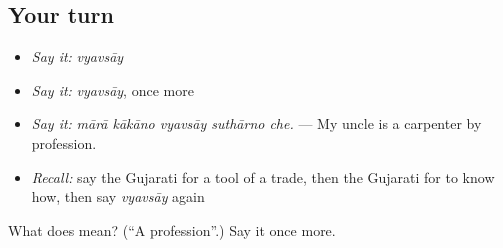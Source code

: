 \subsection*{Your turn}
\begin{itemize}
\raggedright
  \item \emph{Say it:} \emph{vyavsāy}
  \item \emph{Say it:} \emph{vyavsāy}, once more
  \item \emph{Say it:} \emph{mārā kākāno vyavsāy suthārno che.} — My uncle is a carpenter by profession.
  \item \emph{Recall:} say the Gujarati for a tool of a trade, then the Gujarati for to know how, then say \emph{vyavsāy} again
\end{itemize}

\begin{tcolorbox}[breakable,colback=teal!4,colframe=teal!35!black,title={Before you move on}]
What does  mean? (\textquotedblleft{}A profession\textquotedblright{}.) Say it once more.
\end{tcolorbox}
